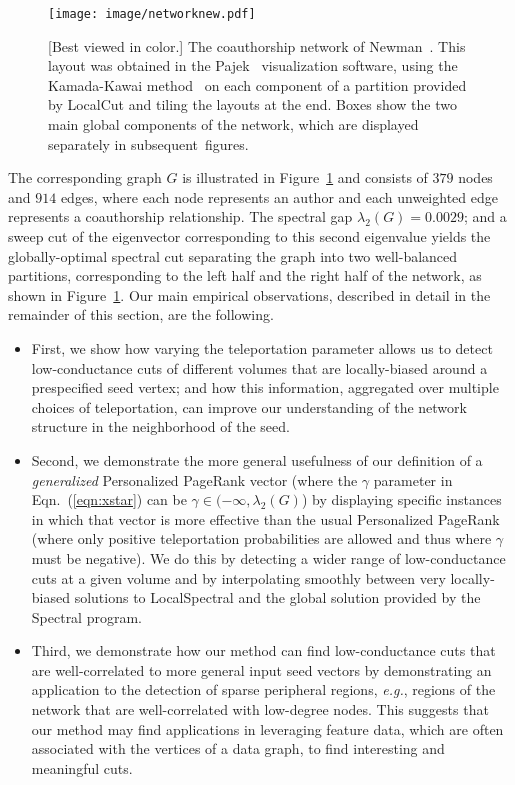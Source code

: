 \documentclass[11pt]{article}
\begin{document}
\begin{figure}[h] 
\begin{center}
\texttt{[image: image/networknew.pdf]} 
\end{center}
\caption{[Best viewed in color.]  The coauthorship network of Newman~\cite{newman2006finding}. This layout was obtained in the Pajek~\cite{Pajek03} visualization software, using the Kamada-Kawai method~\cite{Kamada89} on each component of a partition provided by \textsf{LocalCut} and tiling the layouts at the end.  Boxes show the two main global components of the network, which are displayed separately in subsequent~figures.}
\label{fig:network}
\end{figure}


The corresponding graph $G$ is illustrated in Figure~\ref{fig:network} and
consists of $379$ nodes and $914$ edges, where each node represents an 
author and each unweighted edge represents a coauthorship relationship.
The spectral gap $\lambda_2(G) = 0.0029$; and a sweep cut of the eigenvector 
corresponding to this second eigenvalue yields the globally-optimal spectral 
cut separating the graph into two well-balanced partitions, corresponding to 
the left half and the right half of the network, as shown in 
Figure~\ref{fig:network}.
Our main empirical observations, described in detail in the remainder of 
this section, are the following.
\begin{itemize}
\item
First, we show how varying the teleportation parameter allows us to detect 
low-conductance cuts of different volumes that are locally-biased around a 
prespecified seed vertex; and how this information, aggregated over 
multiple choices of teleportation, can improve our understanding of the 
network structure in the neighborhood of the seed.
\item
Second, we demonstrate the more general usefulness of our definition of a 
\emph{generalized} Personalized PageRank vector (where the $\gamma$ 
parameter in Eqn.~(\ref{eqn:xstar}) can be $\gamma\in(-\infty,\lambda_2(G)$) 
by displaying specific instances in which that vector is more effective than 
the usual Personalized PageRank (where only positive teleportation 
probabilities are allowed and thus where $\gamma$ must be negative).
We do this by detecting a wider range of low-conductance cuts at a given 
volume and by interpolating smoothly between very locally-biased solutions 
to \textsf{LocalSpectral} and the global solution provided by the 
\textsf{Spectral} program.
\item
Third, we demonstrate how our method can find low-conductance cuts that are 
well-correlated to more general input seed vectors by demonstrating an 
application to the detection of sparse peripheral regions, \emph{e.g.}, 
regions of the network that are well-correlated with low-degree nodes.
This suggests that our method may find applications in leveraging 
feature data, which are often associated with the vertices of a 
data graph, to find interesting and meaningful cuts.
\end{itemize}
\end{document}
